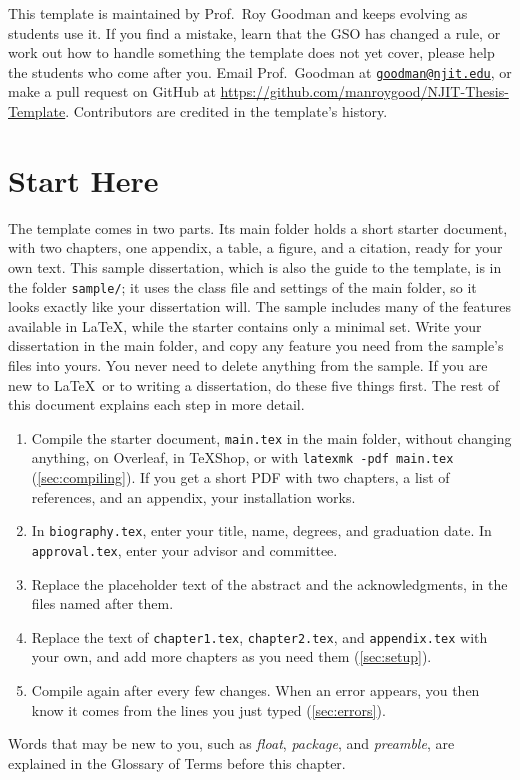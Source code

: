 This template is maintained by Prof.~Roy Goodman and keeps evolving as students use it. If you find a mistake, learn that the GSO has changed a rule, or work out how to handle something the template does not yet cover, please help the students who come after you. Email Prof.~Goodman at \href{mailto:goodman@njit.edu}{\texttt{goodman@njit.edu}}, or make a pull request on GitHub at \url{https://github.com/manroygood/NJIT-Thesis-Template}. Contributors are credited in the template's history.

\section{Start Here}
\label{sec:starthere}

The template comes in two parts. Its main folder holds a short starter document, with two chapters, one appendix, a table, a figure, and a citation, ready for your own text. This sample dissertation, which is also the guide to the template, is in the folder \texttt{sample/}; it uses the class file and settings of the main folder, so it looks exactly like your dissertation will. The sample includes many of the features available in \LaTeX, while the starter contains only a minimal set. Write your dissertation in the main folder, and copy any feature you need from the sample's files into yours. You never need to delete anything from the sample. If you are new to \LaTeX\ or to writing a dissertation, do these five things first. The rest of this document explains each step in more detail.
\begin{enumerate}
\item Compile the starter document, \texttt{main.tex} in the main folder, without changing anything, on Overleaf, in TeXShop, or with \verb+latexmk -pdf main.tex+ (\cref{sec:compiling}). If you get a short PDF with two chapters, a list of references, and an appendix, your installation works.
\item In \texttt{biography.tex}, enter your title, name, degrees, and graduation date. In \texttt{approval.tex}, enter your advisor and committee.
\item Replace the placeholder text of the abstract and the acknowledgments, in the files named after them.
\item Replace the text of \texttt{chapter1.tex}, \texttt{chapter2.tex}, and \texttt{appendix.tex} with your own, and add more chapters as you need them (\cref{sec:setup}).
\item Compile again after every few changes. When an error appears, you then know it comes from the lines you just typed (\cref{sec:errors}).
\end{enumerate}
Words that may be new to you, such as \emph{float}, \emph{package}, and \emph{preamble}, are explained in the Glossary of Terms before this chapter.

